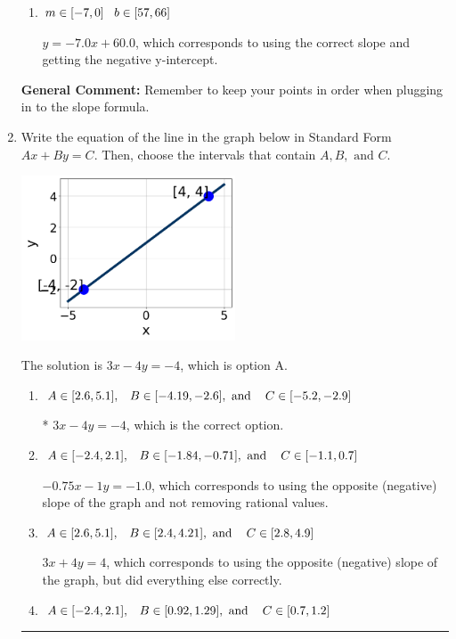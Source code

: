 \documentclass{extbook}[14pt]
\newcommand{\litem}[1]{\item #1

\rule{\textwidth}{0.4pt}}
\begin{document}
\begin{enumerate}
{\begin{enumerate}[label=\Alph*.]
* $y = -7.0x -60.0$, which is the correct option.
\item \( m \in [-7, 0] \hspace*{3mm} b \in [57, 66] \)

 $y = -7.0x + 60.0$, which corresponds to using the correct slope and getting the negative y-intercept.
\end{enumerate}

\textbf{General Comment:} Remember to keep your points in order when plugging in to the slope formula.
}
\litem{
Write the equation of the line in the graph below in Standard Form $Ax+By=C$. Then, choose the intervals that contain $A, B, \text{ and } C$.

\begin{center}
    \includegraphics[width=0.5\textwidth]{../Figures/linearGraphToStandardC.png}
\end{center}


The solution is \( 3x - 4y = -4 \), which is option A.\begin{enumerate}[label=\Alph*.]
\item \( A \in [2.6, 5.1], \hspace{3mm} B \in [-4.19, -2.6], \text{ and } \hspace{3mm} C \in [-5.2, -2.9] \)

* $3x - 4y = -4$, which is the correct option.
\item \( A \in [-2.4, 2.1], \hspace{3mm} B \in [-1.84, -0.71], \text{ and } \hspace{3mm} C \in [-1.1, 0.7] \)

 $-0.75x - 1y = -1.0$, which corresponds to using the opposite (negative) slope of the graph and not removing rational values.
\item \( A \in [2.6, 5.1], \hspace{3mm} B \in [2.4, 4.21], \text{ and } \hspace{3mm} C \in [2.8, 4.9] \)

 $3x + 4y = 4$, which corresponds to using the opposite (negative) slope of the graph, but did everything else correctly.
\item \( A \in [-2.4, 2.1], \hspace{3mm} B \in [0.92, 1.29], \text{ and } \hspace{3mm} C \in [0.7, 1.2] \)


\end{enumerate}}
\end{enumerate}
\end{document}
